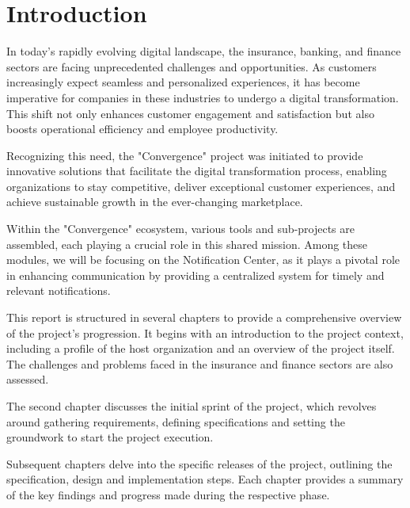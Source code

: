 \chapter*{Introduction}

In today's rapidly evolving digital landscape, the insurance, banking, and finance sectors 
are facing unprecedented challenges and opportunities. As customers increasingly expect seamless
and personalized experiences, it has become imperative for companies in these industries to undergo 
a digital transformation. This shift not only enhances customer engagement and satisfaction but also 
boosts operational efficiency and employee productivity. 

Recognizing this need, the "Convergence" project was initiated to provide innovative solutions 
that facilitate the digital transformation process, enabling organizations to stay competitive, 
deliver exceptional customer experiences, and achieve sustainable growth in the ever-changing 
marketplace.

Within the "Convergence" ecosystem, various tools and sub-projects are assembled, each playing 
a crucial role in this shared mission. Among these modules, we will be focusing on the Notification
Center, as it plays a pivotal role in enhancing communication by providing a centralized system 
for timely and relevant notifications.

This report is structured in several chapters to provide a comprehensive overview of the project's 
progression. It begins with an introduction to the project context, including a profile of the 
host organization and an overview of the project itself. The challenges and problems faced in the 
insurance and finance sectors are also assessed.

The second chapter discusses the initial sprint of the project, which revolves around gathering 
requirements, defining specifications and setting the groundwork to start the project execution.

Subsequent chapters delve into the specific releases of the project, outlining the specification, 
design and implementation steps. Each chapter provides a summary of the key findings and progress 
made during the respective phase.
